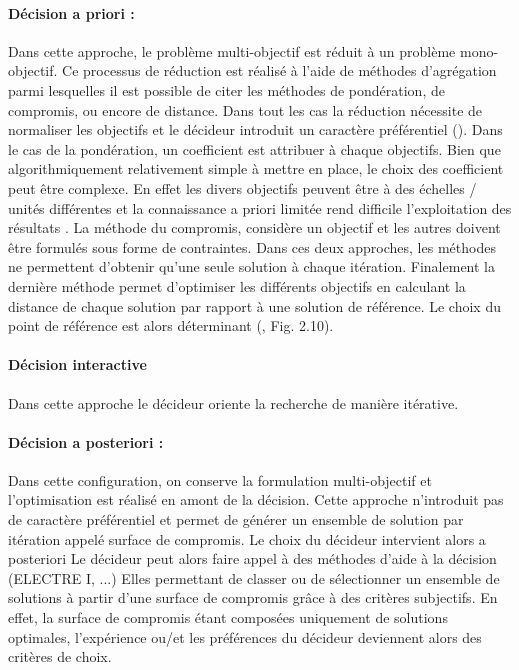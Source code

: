 \paragraph{Décision a priori :} %
\label{par:decision_a_priori}
Dans cette approche, le problème multi-objectif est réduit à un problème mono-objectif.
Ce processus de réduction est réalisé à l’aide de méthodes d’agrégation parmi lesquelles
il est possible de citer les méthodes de pondération, de compromis,
ou encore de distance. Dans tout les cas la réduction nécessite de normaliser les
objectifs et le décideur introduit un caractère préférentiel (\cite{Rivallain2013,Armand-Decker2015}).
Dans le cas de la pondération, un coefficient est attribuer à chaque objectifs. Bien que
algorithmiquement relativement simple à mettre en place, le choix des coefficient peut être complexe.
En effet les divers objectifs peuvent être à des échelles / unités différentes
et la connaissance a priori limitée rend difficile l’exploitation des résultats .
La méthode du compromis, considère un objectif et les autres doivent être formulés
sous forme de contraintes.
Dans ces deux approches, les méthodes ne permettent d’obtenir qu’une seule
solution à chaque itération.
Finalement la dernière méthode permet d’optimiser les différents objectifs en calculant
la distance de chaque solution par rapport à une solution de référence. Le choix
du point de référence est alors déterminant (\cite{Collette2002}, Fig. 2.10).



\paragraph{Décision interactive} %
\label{par:decision_interactive}
Dans cette approche le décideur oriente la recherche de manière itérative.

\paragraph{Décision a posteriori :} %
\label{par:decision_a_posteriori}
Dans cette configuration, on conserve la formulation multi-objectif et l’optimisation
est réalisé en amont de la décision. Cette approche n’introduit pas de
caractère préférentiel et permet de générer un ensemble de solution par itération
appelé surface de compromis.
Le choix du décideur intervient alors a posteriori
Le décideur peut alors faire appel à des méthodes d’aide à la décision (ELECTRE I, ...)
Elles permettant de classer ou de sélectionner un ensemble de solutions
à partir d’une surface de compromis grâce à des critères subjectifs. En effet, la
surface de compromis étant composées uniquement de solutions optimales, l’expérience ou/et
les préférences du décideur deviennent alors des critères de choix.

